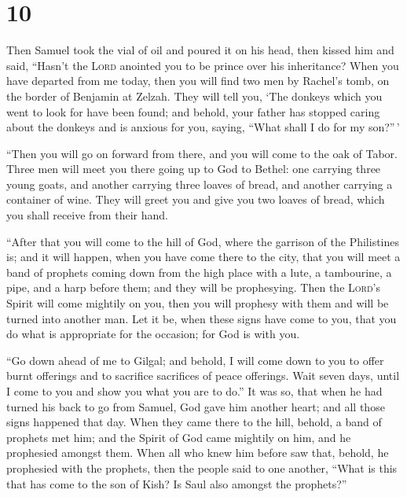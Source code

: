 \hypertarget{section-9}{%
\section{10}\label{section-9}}

 Then Samuel took the vial of oil and poured it on his
head, then kissed him and said, ``Hasn't the \textsc{Lord} anointed you
to be prince over his inheritance?  When you have departed
from me today, then you will find two men by Rachel's tomb, on the
border of Benjamin at Zelzah. They will tell you, `The donkeys which you
went to look for have been found; and behold, your father has stopped
caring about the donkeys and is anxious for you, saying, ``What shall I
do for my son?''\,'

 ``Then you will go on forward from there, and you will
come to the oak of Tabor. Three men will meet you there going up to God
to Bethel: one carrying three young goats, and another carrying three
loaves of bread, and another carrying a container of wine.
 They will greet you and give you two loaves of bread,
which you shall receive from their hand.

 ``After that you will come to the hill of God, where the
garrison of the Philistines is; and it will happen, when you have come
there to the city, that you will meet a band of prophets coming down
from the high place with a lute, a tambourine, a pipe, and a harp before
them; and they will be prophesying.  Then the
\textsc{Lord}'s Spirit will come mightily on you, then you will prophesy
with them and will be turned into another man.  Let it be,
when these signs have come to you, that you do what is appropriate for
the occasion; for God is with you.

 ``Go down ahead of me to Gilgal; and behold, I will come
down to you to offer burnt offerings and to sacrifice sacrifices of
peace offerings. Wait seven days, until I come to you and show you what
you are to do.''  It was so, that when he had turned his
back to go from Samuel, God gave him another heart; and all those signs
happened that day.  When they came there to the hill,
behold, a band of prophets met him; and the Spirit of God came mightily
on him, and he prophesied amongst them.  When all who
knew him before saw that, behold, he prophesied with the prophets, then
the people said to one another, ``What is this that has come to the son
of Kish? Is Saul also amongst the prophets?''

